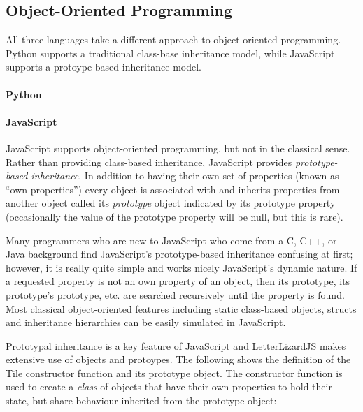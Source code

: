 
\subsection{Object-Oriented Programming}
\label{oop}


All three languages take a different approach to object-oriented programming.
Python supports a traditional class-base inheritance model, while JavaScript
supports a protoype-based inheritance model. 

\paragraph{Python}

\paragraph{JavaScript}
JavaScript supports object-oriented programming, but not in the classical
sense. Rather than providing class-based inheritance, JavaScript provides
\emph{prototype-based inheritance}. In addition to having their own set of 
properties (known as ``own properties'') every object is associated with and
inherits properties from another object called its \emph{prototype} object
indicated by its prototype property (occasionally the value of the prototype
property will be null, but this is rare). 

Many programmers who are new to JavaScript who come from a
C, C++, or Java background find JavaScript's prototype-based inheritance
confusing at first; however, it is really quite simple and works nicely
JavaScript's dynamic nature. If a requested property is not an own property
of an object, then its prototype, its prototype's prototype, etc. are searched
recursively until the property is found. Most classical object-oriented features
including static class-based objects, structs and inheritance hierarchies can be
easily simulated in JavaScript. 

Prototypal inheritance is a key feature of JavaScript and LetterLizardJS makes
extensive use of objects and protoypes. The following shows the definition
of the Tile constructor function and its prototype object. The constructor function
is used to create a \emph{class} of objects that have their own properties to
hold their state, but share behaviour inherited from the prototype object:

